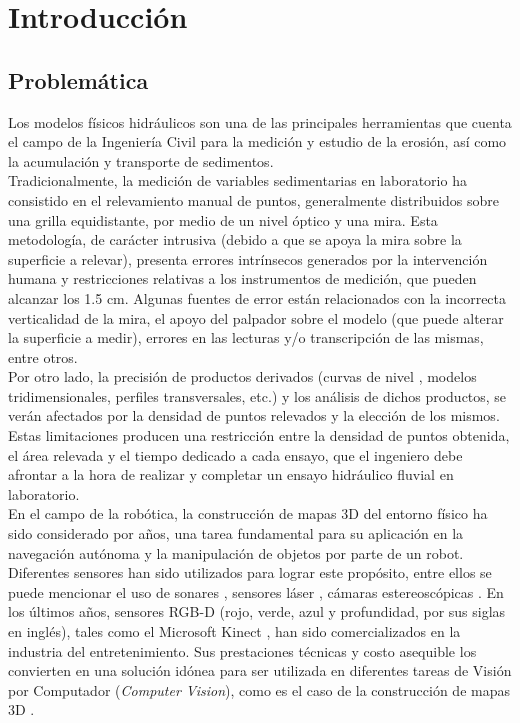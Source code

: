 \chapter{Introducci\'{o}n}

\section{Problemática}
\label{sec:problematica}

Los modelos físicos hidráulicos son una de las principales herramientas que cuenta el campo de la Ingeniería Civil para la medición y estudio de la erosión, así como la acumulación y transporte de sedimentos. \\
Tradicionalmente, la medición de variables sedimentarias en laboratorio ha consistido en el relevamiento manual de puntos, generalmente distribuidos sobre una grilla equidistante, por medio de un nivel óptico y una mira. Esta metodología, de carácter intrusiva (debido a que se apoya la mira sobre la superficie a relevar), presenta errores intrínsecos generados por la intervención humana y restricciones relativas a los instrumentos de medición, que pueden alcanzar los 1.5 cm. Algunas fuentes de error están relacionados con la incorrecta verticalidad de la mira, el apoyo del palpador sobre el modelo (que puede alterar la superficie a medir), errores en las lecturas y/o transcripción de las mismas, entre otros. \\
Por otro lado, la precisión de productos derivados (curvas de nivel \cite{wiki-curva-de-nivel}, modelos tridimensionales, perfiles transversales, etc.) y los análisis de dichos productos, se verán afectados por la densidad de puntos relevados y la elección de los mismos. Estas limitaciones producen una restricción entre la densidad de puntos obtenida, el área relevada y el tiempo dedicado a cada ensayo, que el ingeniero debe afrontar a la hora de realizar y completar un ensayo hidráulico fluvial en laboratorio. \\
En el campo de la robótica, la construcción de mapas 3D del entorno físico ha sido considerado por años, una tarea fundamental para su aplicación en la navegación autónoma y la manipulación de objetos por parte de un robot. Diferentes sensores han sido utilizados para lograr este propósito, entre ellos se puede mencionar el uso de sonares \cite{varveropoulos2005robot}, sensores láser \cite{chou2013robotic}, cámaras estereoscópicas \cite{Konolige08}.
En los últimos años, sensores RGB-D (rojo, verde, azul y profundidad, por sus siglas en inglés), tales como el Microsoft Kinect \cite{microsoft-kinect}, han sido comercializados en la industria del entretenimiento. Sus prestaciones técnicas y costo asequible los convierten en una solución idónea para ser utilizada en diferentes tareas de Visión por Computador (\textit{Computer Vision}), como es el caso de la construcción de mapas 3D \cite{henry2010rgb,engelhard2011real}. \\
